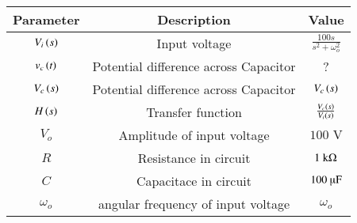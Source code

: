 \begin{tabular}{|c|c|c|}
    \hline
    \textbf{Parameter} & \textbf{Description} & \textbf{Value} \\
    \hline
    $V_i\left(s\right)$ & Input voltage & $ \frac{100s}{s^2+ \omega_o^2}$\\
    \hline
    $v_c\left(t\right)$ & Potential difference across Capacitor & ? \\
    \hline
    $V_c\left(s\right)$ & Potential difference across Capacitor & $V_c\left(s\right)$ \\
    \hline
    $H\left(s\right)$ & Transfer function & $ \frac{V_c\left(s\right)}{V_i\left(s\right)}$ \\
    \hline
    $ V_o$ & Amplitude of input voltage & $ 100 \text{ V}$\\
    \hline
    $R$ & Resistance in circuit & $ 1\text{ k\ohm}$ \\
    \hline
    $C$ & Capacitace in circuit & $ 100 \text{ \micro F}$ \\
    \hline
    $\omega_o$ & angular frequency of input voltage& $ \omega_o$\\
    \hline
\end{tabular}



